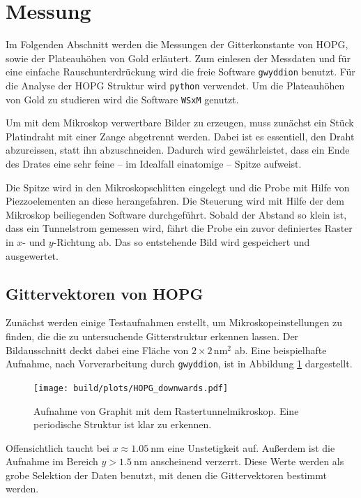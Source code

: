 \section{Messung} %
\label{sec:messung}
Im Folgenden Abschnitt werden die Messungen der Gitterkonstante von HOPG, sowie
der Plateauhöhen von Gold erläutert. Zum einlesen der Messdaten und für eine
einfache Rauschunterdrückung wird die freie Software \texttt{gwyddion}
\cite{gwyddion} benutzt. Für die Analyse der HOPG Struktur wird \texttt{python}
\cite{python3} verwendet.
Um die Plateauhöhen von Gold zu studieren wird die Software \texttt{WSxM} \cite{WSxM} genutzt.

Um mit dem Mikroskop verwertbare Bilder zu erzeugen, muss zunächst ein Stück
Platindraht mit einer Zange abgetrennt werden. Dabei ist es essentiell, den
Draht abzureissen, statt ihn abzuschneiden. Dadurch wird gewährleistet, dass
ein Ende des Drates eine sehr feine -- im Idealfall einatomige -- Spitze
aufweist.

Die Spitze wird in den Mikroskopschlitten eingelegt und die Probe mit Hilfe von
Piezzoelementen an diese herangefahren. Die Steuerung wird mit Hilfe der dem
Mikroskop beiliegenden Software durchgeführt.
Sobald der Abstand so klein ist, dass ein Tunnelstrom gemessen wird, fährt
die Probe ein zuvor definiertes Raster in $x$- und $y$-Richtung ab. Das so
entstehende Bild wird gespeichert und ausgewertet.

\subsection{Gittervektoren von HOPG}
\label{subsec:gitter}
Zunächst werden einige Testaufnahmen erstellt, um Mikroskopeinstellungen zu
finden, die die zu untersuchende Gitterstruktur erkennen lassen.
Der Bildausschnitt deckt dabei eine Fläche von $\num{2}\times\num{2}\,
\si{\nano\meter\squared}$ ab. Eine beispielhafte Aufnahme, nach Vorverarbeitung
durch \texttt{gwyddion}, ist in Abbildung \ref{fig:hopg1} dargestellt.
\begin{figure}
    \centering
    \texttt{[image: build/plots/HOPG\_downwards.pdf]}
    \caption{Aufnahme von Graphit mit dem Rastertunnelmikroskop. Eine
             periodische Struktur ist klar zu erkennen.}
    \label{fig:hopg1}
\end{figure}
Offensichtlich taucht bei $x \approx \SI{1.05}{\nano\meter}$ eine Unstetigkeit
auf. Außerdem ist die Aufnahme im Bereich $y > \SI{1.5}{\nano\meter}$
anscheinend verzerrt. Diese Werte werden als grobe Selektion der Daten
benutzt, mit denen die Gittervektoren bestimmt werden.

